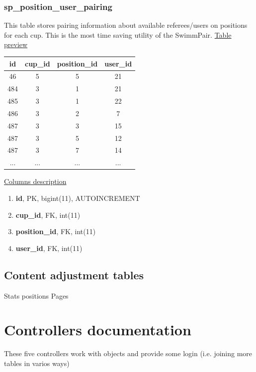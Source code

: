 \subsubsection*{sp\_position\_user\_pairing}
This table stores pairing information about available referees/users on positions for each cup. This is the most time saving utility of the SwimmPair.
\newline
\underline{Table preview}
\begin{center}
 \begin{tabular}{||c c c c||} 
 \hline
 id & cup\_id & position\_id & user\_id  \\ [0.5ex] 
 \hline\hline
 46 & 5 & 5 & 21 \\ 
 \hline
 484 & 3 & 1 & 21 \\ 
 \hline
 485 & 3 & 1 & 22 \\ 
 \hline
 486 & 3 & 2 & 7 \\
 \hline
 487 & 3 & 3 & 15 \\
 \hline
 487 & 3 & 5 & 12 \\
 \hline
 487 & 3 & 7 & 14 \\
 \hline
 ... & ... & ... & ... \\ [1ex] 
 \hline
\end{tabular}
\end{center}
\underline{Columns description}
\begin{enumerate}
  \setlength\itemsep{0em}
  \item \textbf{id}, PK, bigint(11), AUTOINCREMENT
  \item \textbf{cup\_id}, FK, int(11)
  \item \textbf{position\_id}, FK, int(11)
  \item \textbf{user\_id}, FK, int(11)
\end{enumerate}
\subsection{Content adjustment tables}
Stats positions
Pages

\section{Controllers documentation}
\par These five controllers work with objects and provide some login (i.e. joining more tables in varios ways)
